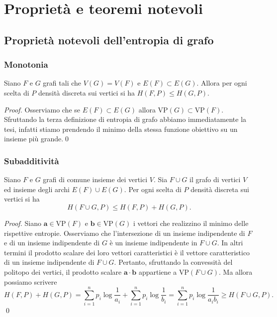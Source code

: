 \chapter{Proprietà e teoremi notevoli} 
\section{Proprietà notevoli dell'entropia di grafo} 
\subsection{Monotonia} 
\begin{lemma}
	Siano \(F\) e \(G\) grafi tali che \(V(G)=V(F)\) e \(E(F)\subset E(G)\). Allora per ogni scelta di \(P\) densità discreta sui vertici si ha \(H(F,P)\le H(G,P)\). 
\end{lemma}
\begin{proof}
	Osserviamo che se \(E(F)\subset E(G)\) allora \(\text{VP}(G)\subset \text{VP}(F)\). Sfruttando la terza definizione di entropia di grafo abbiamo immediatamente la tesi, infatti stiamo prendendo il minimo della stessa funzione obiettivo su un insieme più grande.\qed 
\end{proof}

\subsection{Subadditività} 
\begin{lemma}
	Siano \(F\) e \(G\) grafi di comune insieme dei vertici \(V\). Sia \(F\cup G\) il grafo di vertici \(V\) ed insieme degli archi \(E(F)\cup E(G)\). Per ogni scelta di \(P\) densità discreta sui vertici si ha
	\[H(F\cup G,P)\le H(F,P)+H(G,P).\]
\end{lemma}
\begin{proof}
	Siano \(\mathbf{a}\in \text{VP}(F)\) e \(\mathbf{b}\in \text{VP}(G)\) i vettori che realizzino il minimo delle rispettive entropie. Osserviamo che l'intersezione di un insieme indipendente di \(F\) e di un insieme indipendente di \(G\) è un insieme indipendente in \(F\cup G\). In altri termini il prodotto scalare dei loro vettori caratteristici è il vettore caratteristico di un insieme indipendente di \(F\cup G\). Pertanto, sfruttando la convessità del politopo dei vertici, il prodotto scalare \(\mathbf{a}\cdot \mathbf{b}\) appartiene a \(\text{VP}(F\cup G)\). Ma allora possiamo scrivere
	\[H(F,P)+H(G,P)=\sum_{i=1}^n p_i\log{\frac{1}{a_i}}+\sum_{i=1}^n p_i\log{\frac{1}{b_i}}=\sum_{i=1}^n p_i\log{\frac{1}{a_{i}b_{i}}}\ge H(F\cup G,P).\]
	\qed 
\end{proof}

